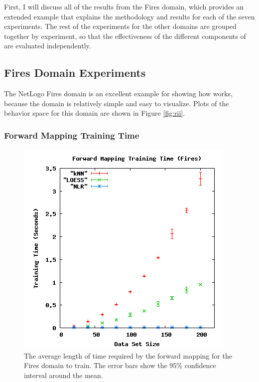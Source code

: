 First, I will discuss all of the results from the Fires domain, which provides an extended example that explains the methodology and results for each of the seven experiments.
The rest of the experiments  for the other domains are grouped together by experiment, so that the effectiveness of the different components of \fw are evaluated independently.

 \subsection{Fires Domain Experiments}

The NetLogo Fires domain is an excellent example for showing how \fw works, because the domain is relatively simple and easy to visualize.
Plots of the behavior space for this domain are shown in Figure \ref{fig:rii}.




\subsubsection{Forward Mapping Training Time}


\begin{figure}[ht]
\centering
\includegraphics[scale=.5]{images/results_fires/fmtraining.png}
\caption{The average length of time required by the forward mapping for the Fires domain to train.
The error bars show the 95\% confidence interval around the mean.}
\label{fig:firefmtraining}
\end{figure}

